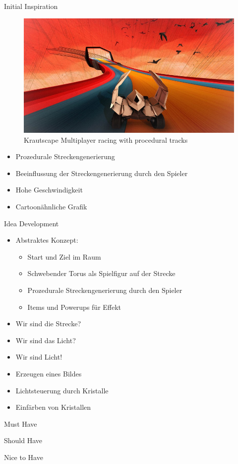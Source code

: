 \slideonetoone
{Initial Inspiration}
{
	\begin{figure}
		\centering
		\includegraphics[width=\textwidth, height=0.7\textheight, keepaspectratio]{images/krautscape_ks1}
		\caption{Krautscape \linebreak Multiplayer racing with procedural tracks}
	\end{figure}
}
{
	\begin{itemize}
		\item Prozedurale Streckengenerierung
		\item Beeinflussung der Streckengenerierung durch den Spieler
		\item Hohe Geschwindigkeit
		\item Cartoonähnliche Grafik
	\end{itemize}
}

\slideonetoone
{Idea Development}
{
	\begin{itemize}
		\item Abstraktes Konzept:
		\begin{itemize}
			\item Start und Ziel im Raum
			\item Schwebender Torus als Spielfigur auf der Strecke
			\item Prozedurale Streckengenerierung durch den Spieler
			\item Items und Powerups für Effekt
		\end{itemize}
		\item Wir sind die Strecke?
		\item Wir sind das Licht?
		\item Wir sind Licht!
		\item Erzeugen eines Bildes
		\item Lichtsteuerung durch Kristalle
		\item Einfärben von Kristallen
	\end{itemize}
}
{

}

\begin{frame}{Must Have}
\end{frame}

\begin{frame}{Should Have}
\end{frame}

\begin{frame}{Nice to Have}
\end{frame}

%


